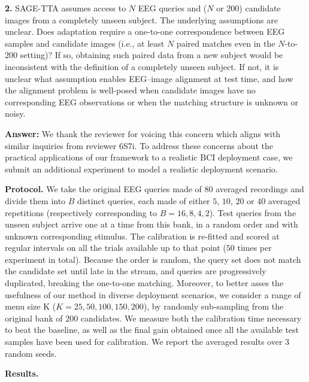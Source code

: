 \documentclass[11pt]{article}
\newcommand{\answer}[1]{{\textbf{Answer:} \color{blue} #1}}
\begin{document}
\textbf{2.} SAGE-TTA assumes access to $N$ EEG queries and ($N$ or 200) candidate images from a
completely unseen subject. The underlying assumptions are unclear. Does adaptation require a
one-to-one correspondence between EEG samples and candidate images (i.e., at least $N$ paired matches
even in the $N$-to-200 setting)? If so, obtaining such paired data from a new subject would be
inconsistent with the definition of a completely unseen subject. If not, it is unclear what assumption
enables EEG--image alignment at test time, and how the alignment problem is well-posed when candidate
images have no corresponding EEG observations or when the matching structure is unknown or noisy.
\answer{
We thank the reviewer for voicing this concern which aligns with similar inquiries from reviewer 6S7i. To address these concerns about the practical applications of our framework to a realistic BCI deployment case, we submit an additional experiment to model a realistic deployment scenario. 

\textbf{Protocol.} We take the original EEG queries made of $80$ averaged recordings and divide them
into $B$ distinct queries, each made of either $5$, $10$, $20$ or $40$ averaged repetitions (respectively corresponding to $B = 16, 8, 4, 2$). Test queries from the unseen subject arrive one at a time from this bank, in a random order and with unknown
corresponding stimulus. The calibration is re-fitted and scored at regular intervals on all the trials available up to that point ($50$ times per experiment in total). Because the order is random, the query set does not match the candidate set until late in the stream, and queries are progressively duplicated, breaking the one-to-one matching. Moreover, to better asses the usefulness of our method in diverse deployment scenarios, we consider a range of menu size K ($K = 25, 50, 100, 150, 200$), by randomly sub-sampling from the original bank of $200$ candidates. We measure both the calibration time necessary to beat the baseline, as well as the final gain obtained once all the available test samples have been used for calibration. We report the averaged results over 3 random seeds.

\textbf{Results.}

}
\end{document}
